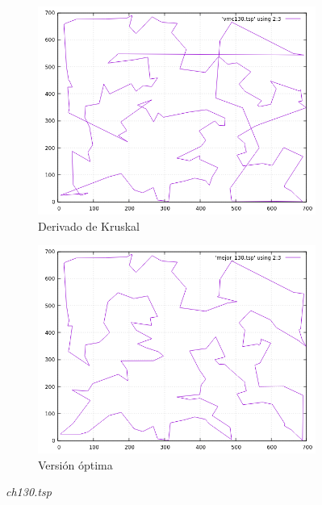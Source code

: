 \documentclass[12pt,spanish]{article}
\begin{document}
\begin{figure}[H]
\begin{subfigure}[b]{0.36\textwidth}
\includegraphics[width=\textwidth]{ch130_vmc.png}
\caption{Derivado de Kruskal}
\end{subfigure}
\quad
\begin{subfigure}[b]{0.36\textwidth}
\includegraphics[width=\textwidth]{ch130_mejor.png}
\caption{Versión óptima}
\end{subfigure}
\caption{\textit{ch130.tsp}}
\end{figure}
\end{document}
